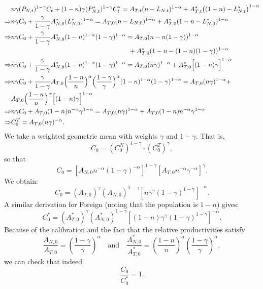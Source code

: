 \documentclass[a4paper,12pt]{article} %
\theoremstyle{nonitalic}
\begin{document}
\begin{align*}
    & n\gamma (P_{N,t})^{1-\gamma} C_t + (1-n)\gamma (P^*_{N,t})^{1-\gamma} C^*_t = A_{T,t} (n-L_{N,t})^{ 1-\alpha} + A^*_{T,t} \big((1-n)-L^*_{N,t}\big)^{ 1-\alpha} \\
    \Rightarrow & n\gamma C_0 + \frac{\gamma}{1-\gamma} A_{N,0}^*(L_{N,0}^*)^{1-\alpha} = A_{T,0} (n - L_{N,0})^{1-\alpha} + A^*_{T,0} (1-n - L_{N,0}^*)^{1-\alpha} \\
    \Rightarrow & n\gamma C_0 + \frac{\gamma}{1-\gamma} A_{N,0}^*(1-n)^{1-\alpha} (1-\gamma)^{1-\alpha} = A_{T,0} (n - n(1-\gamma))^{1-\alpha} \\
    &\quad\quad\quad\quad\quad\quad\quad\quad\quad\quad\quad\quad\quad\quad\quad\quad\quad\quad + A^*_{T,0} (1-n - (1-n)(1-\gamma))^{1-\alpha} \\
    \Rightarrow & n\gamma C_0 + \frac{\gamma}{1-\gamma} A_{N,0}^*(1-n)^{1-\alpha} (1-\gamma)^{1-\alpha} = A_{T,0} (n\gamma)^{1-\alpha} + A^*_{T,0} \Bigl[(1-n)\gamma\Bigr]^{1-\alpha} \\
    \Rightarrow & n\gamma C_0 + \frac{\gamma}{1-\gamma} A_{T,0} \Bigl(\frac{1-n}{n}\Bigr)^{\alpha} \Bigl(\frac{1-\gamma}{\gamma}\Bigr)^{\alpha} (1-n)^{1-\alpha} (1-\gamma)^{1-\alpha} = A_{T,0} (n\gamma)^{1-\alpha} + \\
    & A_{T,0} \Bigl(\frac{1-n}{n}\Bigr)^{\alpha} \Bigl[(1-n)\gamma\Bigr]^{1-\alpha} \\
    \Rightarrow & n\gamma C_0 + A_{T,0}(1-n) n^{-\alpha} \gamma^{1-\alpha} = A_{T,0} (n\gamma)^{1-\alpha} + A_{T,0} (1-n) n^{-\alpha} \gamma^{1-\alpha} \\
    \Rightarrow & C_0^T = A_{T,0} (n\gamma)^{-\alpha}.
\end{align*}
We take a weighted geometric mean with weights $\gamma$ and $1-\gamma$. That is,
\[
C_0 = (C_{0}^N)^{1-\gamma} \cdot (C_{0}^T)^{\gamma},
\]
so that
\[
C_0 = \left[A_{N,0}  n^{-\alpha}(1-\gamma)^{-\alpha}\right]^{1-\gamma}
\left[A_{T,0}  n^{-\alpha} \gamma^{-\alpha}\right]^{\gamma}.
\]
We obtain:
\[
C_0 = (A_{T,0})^{\gamma}(A_{N,0})^{1-\gamma}  \left[n \gamma^{\gamma}(1-\gamma)^{1-\gamma}\right]^{-\alpha}. \tag{6e}
\]
A similar derivation for Foreign (noting that the population is $1-n$) gives:
\[
C^*_0 = (A^*_{T,0})^{\gamma}(A^*_{N,0})^{1-\gamma} \left[(1-n)\gamma^{\gamma}(1-\gamma)^{1-\gamma}\right]^{-\alpha}. \tag{6f}
\]
Because of the calibration and the fact that the relative productivities satisfy
\[
\frac{A_{N,0}}{A_{T,0}} = \left(\frac{1-\gamma}{\gamma}\right)^{\alpha} \quad \text{and} \quad \frac{A^*_{N,0}}{A^*_{T,0}} = \left(\frac{1-n}{n}\right)^{\alpha}\left(\frac{1-\gamma}{\gamma}\right)^{\alpha},
\]
we can check that indeed
\[
\frac{C_0}{C^*_0}=1. \tag{6g}
\]
\end{document}
